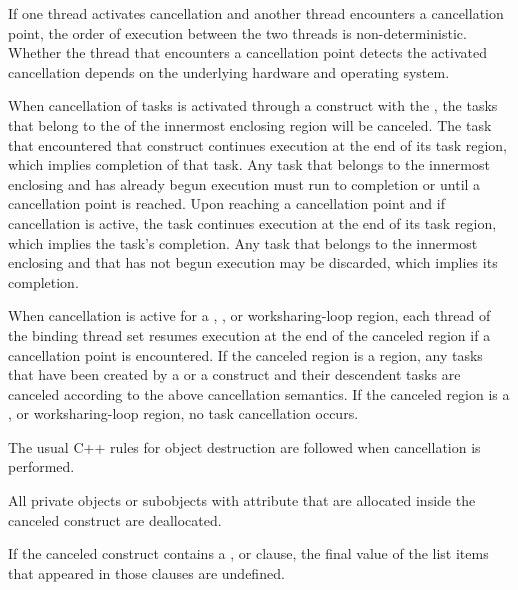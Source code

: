 \begin{note}
If one thread activates cancellation and another thread encounters a cancellation
point, the order of execution between the two threads is non-deterministic.
Whether the thread that encounters a cancellation point detects the activated 
cancellation depends on the underlying hardware and operating system.
\end{note}

When cancellation of tasks is activated through a  construct with
the  , the tasks that belong to the
 of the innermost enclosing  region
will be canceled. The task that encountered that construct continues execution
at the end of its task region, which implies completion of that
task. Any task that belongs to the innermost enclosing
 and has already begun execution must run to
completion or until a cancellation point is reached. Upon reaching a
cancellation point and if cancellation is active, the task continues
execution at the end of its task region, which implies the
task's completion. Any task that belongs to the innermost enclosing
 and that has not begun execution may be discarded,
which implies its completion.

When cancellation is active for a , , or
worksharing-loop region, each thread of the binding thread set resumes 
execution at the end of the canceled region if a cancellation point is 
encountered. If the canceled region is a  region, any
tasks that have been created by a  or a  construct and their descendent 
tasks are canceled according to the above  cancellation 
semantics. If the canceled region is a , or worksharing-loop 
region, no task cancellation occurs.

\begin{cppspecific}
The usual C++ rules for object destruction are followed when cancellation is performed.
\end{cppspecific}

\begin{fortranspecific}
All private objects or subobjects with  attribute that 
are allocated inside the canceled construct are deallocated.
\end{fortranspecific}

If the canceled construct contains a ,  
or  clause, the final value of the list items that 
appeared in those clauses are undefined.


